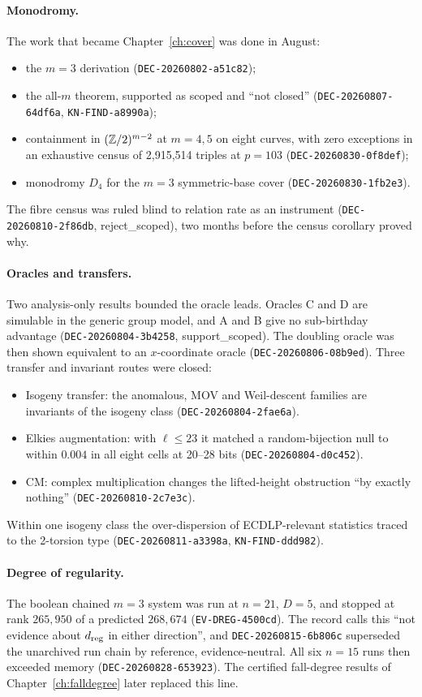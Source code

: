 \paragraph{Monodromy.} The work that became Chapter~\ref{ch:cover} was
done in August:
\begin{itemize}
\item the $m=3$ derivation (\texttt{DEC-20260802-a51c82});
\item the all-$m$ theorem, supported as scoped and ``not closed''
  (\texttt{DEC-20260807-64df6a}, \texttt{KN-FIND-a8990a});
\item containment in $(\mathbb{Z}/2)^{m-2}$ at $m=4,5$ on eight curves, with zero
  exceptions in an exhaustive census of 2{,}915{,}514 triples at $p=103$
  (\texttt{DEC-20260830-0f8def});
\item monodromy $D_4$ for the $m=3$ symmetric-base cover
  (\texttt{DEC-20260830-1fb2e3}).
\end{itemize}
The fibre census was ruled blind to relation rate as an instrument
(\texttt{DEC-20260810-2f86db}, reject\_scoped), two months before the
census corollary proved why.

\paragraph{Oracles and transfers.} Two analysis-only results bounded the
oracle leads. Oracles C and D are simulable in the generic group model, and
A and B give no sub-birthday advantage (\texttt{DEC-20260804-3b4258},
support\_scoped). The doubling oracle was then shown equivalent to an
$x$-coordinate oracle (\texttt{DEC-20260806-08b9ed}). Three transfer and
invariant routes were closed:
\begin{itemize}
\item Isogeny transfer: the anomalous, MOV and Weil-descent families are
  invariants of the isogeny class (\texttt{DEC-20260804-2fae6a}).
\item Elkies augmentation: with $\ell\le23$ it matched a random-bijection
  null to within $0.004$ in all eight cells at 20--28 bits
  (\texttt{DEC-20260804-d0c452}).
\item CM: complex multiplication changes the lifted-height obstruction ``by
  exactly nothing'' (\texttt{DEC-20260810-2c7e3c}).
\end{itemize}
Within one isogeny class the over-dispersion of ECDLP-relevant statistics
traced to the 2-torsion type (\texttt{DEC-20260811-a3398a},
\texttt{KN-FIND-ddd982}).

\paragraph{Degree of regularity.} The boolean chained $m=3$ system was
run at $n=21$, $D=5$, and stopped at rank $265{,}950$ of a predicted
$268{,}674$ (\texttt{EV-DREG-4500cd}). The record calls this ``not evidence
about $d_{\rm reg}$ in either direction'', and \texttt{DEC-20260815-6b806c}
superseded the unarchived run chain by reference, evidence-neutral. All six $n=15$ runs then
exceeded memory (\texttt{DEC-20260828-653923}). The certified
fall-degree results of Chapter~\ref{ch:falldegree} later replaced this
line.

